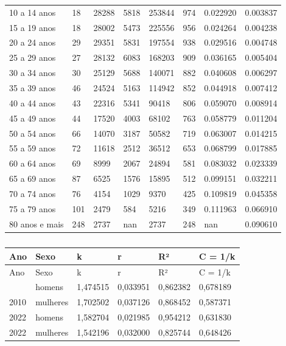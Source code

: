 \documentclass[
  12pt,
  a4paper,
]{scrreprt}
\begin{document}
\begin{longtable}[]{@{}llllllll@{}}
10 a 14 anos & 18 & 28288 & 5818 & 253844 & 974 & 0.022920 & 0.003837 \\
15 a 19 anos & 18 & 28002 & 5473 & 225556 & 956 & 0.024264 & 0.004238 \\
20 a 24 anos & 29 & 29351 & 5831 & 197554 & 938 & 0.029516 & 0.004748 \\
25 a 29 anos & 27 & 28132 & 6083 & 168203 & 909 & 0.036165 & 0.005404 \\
30 a 34 anos & 30 & 25129 & 5688 & 140071 & 882 & 0.040608 & 0.006297 \\
35 a 39 anos & 46 & 24524 & 5163 & 114942 & 852 & 0.044918 & 0.007412 \\
40 a 44 anos & 43 & 22316 & 5341 & 90418 & 806 & 0.059070 & 0.008914 \\
45 a 49 anos & 44 & 17520 & 4003 & 68102 & 763 & 0.058779 & 0.011204 \\
50 a 54 anos & 66 & 14070 & 3187 & 50582 & 719 & 0.063007 & 0.014215 \\
55 a 59 anos & 72 & 11618 & 2512 & 36512 & 653 & 0.068799 & 0.017885 \\
60 a 64 anos & 69 & 8999 & 2067 & 24894 & 581 & 0.083032 & 0.023339 \\
65 a 69 anos & 87 & 6525 & 1576 & 15895 & 512 & 0.099151 & 0.032211 \\
70 a 74 anos & 76 & 4154 & 1029 & 9370 & 425 & 0.109819 & 0.045358 \\
75 a 79 anos & 101 & 2479 & 584 & 5216 & 349 & 0.111963 & 0.066910 \\
80 anos e mais & 248 & 2737 & nan & 2737 & 248 & nan & 0.090610 \\
\end{longtable}

\begin{longtable}[]{@{}llllll@{}}
\caption{}\label{T_a87cd}\tabularnewline
\toprule\noalign{}
Ano & Sexo & k & r & R² & C = 1/k \\
\midrule\noalign{}
\endfirsthead
\toprule\noalign{}
Ano & Sexo & k & r & R² & C = 1/k \\
\midrule\noalign{}
\endhead
\bottomrule\noalign{}
\endlastfoot
2010 & homens & 1,474515 & 0,033951 & 0,862382 & 0,678189 \\
2010 & mulheres & 1,702502 & 0,037126 & 0,868452 & 0,587371 \\
2022 & homens & 1,582704 & 0,021985 & 0,954212 & 0,631830 \\
2022 & mulheres & 1,542196 & 0,032000 & 0,825744 & 0,648426 \\
\end{longtable}
\end{document}
